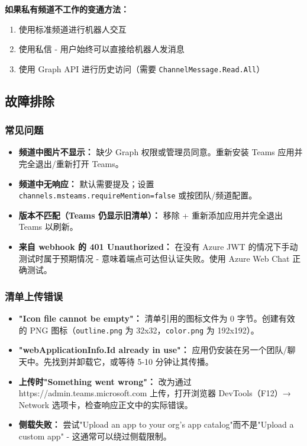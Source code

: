 \textbf{如果私有频道不工作的变通方法：}

\begin{enumerate}
  \item 使用标准频道进行机器人交互
  \item 使用私信 - 用户始终可以直接给机器人发消息
  \item 使用 Graph API 进行历史访问（需要 \texttt{ChannelMessage.Read.All}）
\end{enumerate}


\subsection{故障排除}


\subsubsection{常见问题}


\begin{itemize}
  \item \textbf{频道中图片不显示：} 缺少 Graph 权限或管理员同意。重新安装 Teams 应用并完全退出/重新打开 Teams。
  \item \textbf{频道中无响应：} 默认需要提及；设置 \texttt{channels.msteams.requireMention=false} 或按团队/频道配置。
  \item \textbf{版本不匹配（Teams 仍显示旧清单）：} 移除 + 重新添加应用并完全退出 Teams 以刷新。
  \item \textbf{来自 webhook 的 401 Unauthorized：} 在没有 Azure JWT 的情况下手动测试时属于预期情况 - 意味着端点可达但认证失败。使用 Azure Web Chat 正确测试。
\end{itemize}


\subsubsection{清单上传错误}


\begin{itemize}
  \item \textbf{"Icon file cannot be empty"：} 清单引用的图标文件为 0 字节。创建有效的 PNG 图标（\texttt{outline.png} 为 32x32，\texttt{color.png} 为 192x192）。
  \item \textbf{"webApplicationInfo.Id already in use"：} 应用仍安装在另一个团队/聊天中。先找到并卸载它，或等待 5-10 分钟让其传播。
  \item \textbf{上传时"Something went wrong"：} 改为通过 https://admin.teams.microsoft.com 上传，打开浏览器 DevTools（F12）→ Network 选项卡，检查响应正文中的实际错误。
  \item \textbf{侧载失败：} 尝试"Upload an app to your org's app catalog"而不是"Upload a custom app" - 这通常可以绕过侧载限制。
\end{itemize}


